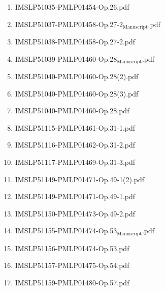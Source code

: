 \documentclass[11pt]{article}
\begin{document}
\begin{enumerate}
\begin{enumerate}
\begin{enumerate}
\item IMSLP51035-PMLP01454-Op.26.pdf
\label{sec-1-1-1-1-44-9-6-7-20}

\item IMSLP51037-PMLP01458-Op.27-2$_{\text{Manuscript}}$.pdf
\label{sec-1-1-1-1-44-9-6-7-21}

\item IMSLP51038-PMLP01458-Op.27-2.pdf
\label{sec-1-1-1-1-44-9-6-7-22}

\item IMSLP51039-PMLP01460-Op.28$_{\text{Manuscript}}$.pdf
\label{sec-1-1-1-1-44-9-6-7-23}

\item IMSLP51040-PMLP01460-Op.28(2).pdf
\label{sec-1-1-1-1-44-9-6-7-24}

\item IMSLP51040-PMLP01460-Op.28(3).pdf
\label{sec-1-1-1-1-44-9-6-7-25}

\item IMSLP51040-PMLP01460-Op.28.pdf
\label{sec-1-1-1-1-44-9-6-7-26}

\item IMSLP51115-PMLP01461-Op.31-1.pdf
\label{sec-1-1-1-1-44-9-6-7-27}

\item IMSLP51116-PMLP01462-Op.31-2.pdf
\label{sec-1-1-1-1-44-9-6-7-28}

\item IMSLP51117-PMLP01469-Op.31-3.pdf
\label{sec-1-1-1-1-44-9-6-7-29}

\item IMSLP51149-PMLP01471-Op.49-1(2).pdf
\label{sec-1-1-1-1-44-9-6-7-30}

\item IMSLP51149-PMLP01471-Op.49-1.pdf
\label{sec-1-1-1-1-44-9-6-7-31}

\item IMSLP51150-PMLP01473-Op.49-2.pdf
\label{sec-1-1-1-1-44-9-6-7-32}

\item IMSLP51155-PMLP01474-Op.53$_{\text{Manuscript}}$.pdf
\label{sec-1-1-1-1-44-9-6-7-33}

\item IMSLP51156-PMLP01474-Op.53.pdf
\label{sec-1-1-1-1-44-9-6-7-34}

\item IMSLP51157-PMLP01475-Op.54.pdf
\label{sec-1-1-1-1-44-9-6-7-35}

\item IMSLP51159-PMLP01480-Op.57.pdf
\label{sec-1-1-1-1-44-9-6-7-36}


\end{enumerate}
\end{enumerate}
\end{enumerate}
\end{document}
